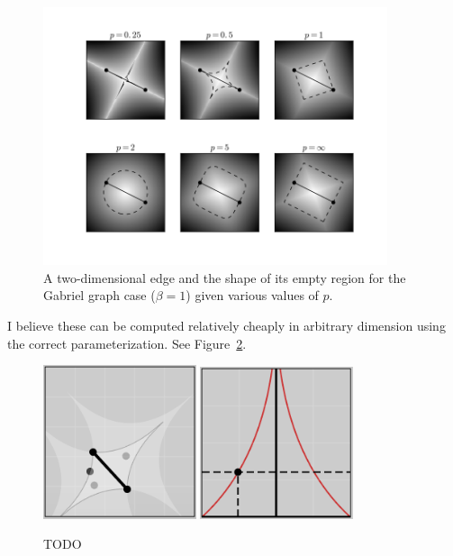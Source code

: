 \documentclass[12pt]{article}
\begin{document}
\begin{figure}[!ht]
  \centering
  \includegraphics[width=0.9\textwidth]{figs/chap6/emptyRegions}
  \caption[Gabriel graph empty regions using various $L_p$-norms]{A
  two-dimensional edge and the shape of its empty region for the Gabriel graph
  case ($\beta=1$) given various values of $p$.}
  \label{fig:ergs}
\end{figure}

I believe these can be computed relatively cheaply in arbitrary dimension using
the correct parameterization. See Figure~\ref{fig:ergParameterization}.

\begin{figure}[!ht]
  \centering
  \includegraphics[width=0.4\textwidth]{figs/chap6/bskeleton}
  \includegraphics[width=0.4\textwidth]{figs/chap6/bskeletonParameter}
  \caption[Example edge test where $\beta=.4$ and $p=0.5$. The space can be
  parameterized by the edge.]{TODO}
  \label{fig:ergParameterization}
\end{figure}
\end{document}
